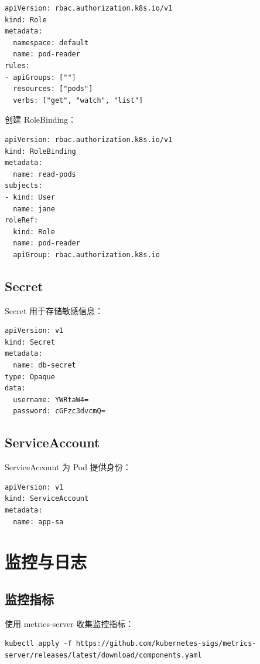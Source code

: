 \documentclass[12pt,UTF8]{ctexbook}
\begin{document}
\begin{lstlisting}
apiVersion: rbac.authorization.k8s.io/v1
kind: Role
metadata:
  namespace: default
  name: pod-reader
rules:
- apiGroups: [""]
  resources: ["pods"]
  verbs: ["get", "watch", "list"]
\end{lstlisting}

创建 RoleBinding：
\begin{lstlisting}
apiVersion: rbac.authorization.k8s.io/v1
kind: RoleBinding
metadata:
  name: read-pods
subjects:
- kind: User
  name: jane
roleRef:
  kind: Role
  name: pod-reader
  apiGroup: rbac.authorization.k8s.io
\end{lstlisting}

\section{Secret}
\label{sec:secret}

Secret 用于存储敏感信息：

\begin{lstlisting}
apiVersion: v1
kind: Secret
metadata:
  name: db-secret
type: Opaque
data:
  username: YWRtaW4=
  password: cGFzc3dvcmQ=
\end{lstlisting}

\section{ServiceAccount}
\label{sec:serviceaccount}

ServiceAccount 为 Pod 提供身份：

\begin{lstlisting}
apiVersion: v1
kind: ServiceAccount
metadata:
  name: app-sa
\end{lstlisting}

\chapter{监控与日志}
\label{chap:monitoring}

\section{监控指标}
\label{sec:metrics}

使用 metrics-server 收集监控指标：

\begin{lstlisting}
kubectl apply -f https://github.com/kubernetes-sigs/metrics-server/releases/latest/download/components.yaml
\end{lstlisting}
\end{document}
